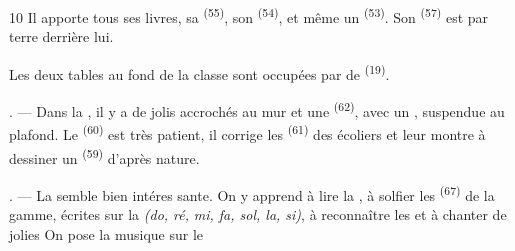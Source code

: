 \begin{VUpage}[12]{10}
\VUblancAlinea
Il apporte tous ses livres, sa \textsuperscript{(55)}, son\nl
{}\textsuperscript{(54)}, et même un  \textsuperscript{(53)}.\nl
Son \textsuperscript{(57)} est par terre derrière lui.

\VUblancAlinea
Les deux tables au fond de la classe sont occupées\nl
par de \textsuperscript{(19)}.

. --- Dans la , il y a de jolis\nl
{} accrochés au mur et une \textsuperscript{(62)}, avec un\nl
{}, suspendue au plafond. Le \textsuperscript{(60)}\nl
est très patient, il corrige les \textsuperscript{(61)} des écoliers\nl
et leur montre à dessiner un  \textsuperscript{(59)} d'après\nl
nature.

. --- La  semble bien intéres\cc
sante. On y apprend à lire la , à solfier les\nl
{}\textsuperscript{(67)} de la gamme, écrites sur la  \textit{(do, ré,}\nl
\textit{mi, fa, sol, la, si)}, à reconnaître les  et à chanter\nl
de jolies  On pose la musique sur le
\parplein
\end{VUpage}

